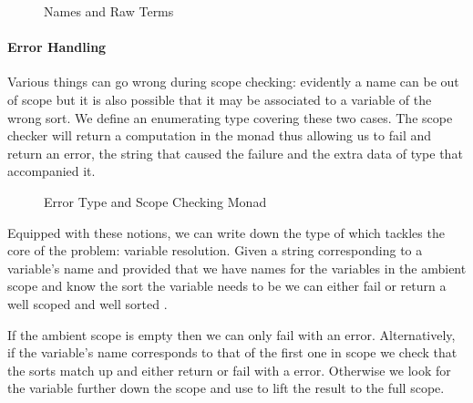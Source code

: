 \begin{figure}[h]
\begin{minipage}{0.35\textwidth}
\end{minipage}
\begin{minipage}{0.55\textwidth}
\end{minipage}
\caption{Names and Raw Terms}
\end{figure}

\paragraph{Error Handling} Various things can go wrong during scope checking:
evidently a name can be out of scope but it is also possible that it may be
associated to a variable of the wrong sort. We define an enumerating type
covering these two cases. The scope checker will return a computation in the
monad  thus allowing us to fail and return an error, the string that
caused the failure and the extra data of type  that accompanied it.

\begin{figure}[h]
\begin{minipage}{0.5\textwidth}
\end{minipage}
\begin{minipage}{0.4\textwidth}
\end{minipage}
\caption{Error Type and Scope Checking Monad}\label{fig:scopemonad}
\end{figure}

Equipped with these notions, we can write down the type of 
which tackles the core of the problem: variable resolution. Given a string
corresponding to a variable's name and provided that we have names for the
variables in the ambient scope and know the sort the variable needs to be
we can either fail or return a well scoped and well sorted .

If the ambient scope is empty then we can only fail with an  error.
Alternatively, if the variable's name corresponds to that of the first one
in scope we check that the sorts match up and either return  or fail
with a  error. Otherwise we look for the variable further
down the scope and use  to lift the result to the full scope.

